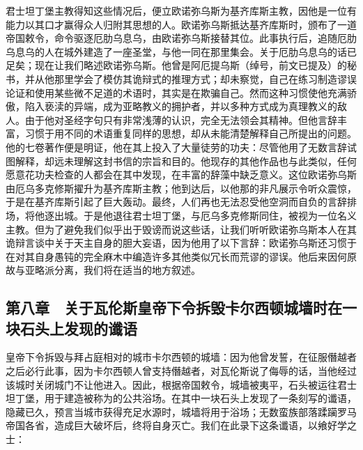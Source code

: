 君士坦丁堡主教得知这些情况后，便立欧诺弥乌斯为基齐库斯主教，因他是一位有能力以其口才赢得众人归附其思想的人。欧诺弥乌斯抵达基齐库斯时，颁布了一道帝国敕令，命令驱逐厄肋乌息乌，由欧诺弥乌斯接替其位。此事执行后，追随厄肋乌息乌的人在城外建造了一座圣堂，与他一同在那里集会。关于厄肋乌息乌的话已足矣；现在让我们略述欧诺弥乌斯。他曾是阿厄提乌斯（绰号，前文已提及）的秘书，并从他那里学会了模仿其诡辩式的推理方式；却未察觉，自己在练习制造谬误论证和使用某些微不足道的术语时，其实是在欺骗自己。然而这种习惯使他充满骄傲，陷入亵渎的异端，成为亚略教义的拥护者，并以多种方式成为真理教义的敌人。由于他对圣经字句只有非常浅薄的认识，完全无法领会其精神。但他言辞丰富，习惯于用不同的术语重复同样的思想，却从未能清楚解释自己所提出的问题。他的七卷著作便是明证，他在其上投入了大量徒劳的功夫：尽管他用了无数言辞试图解释，却远未理解这封书信的宗旨和目的。他现存的其他作品也与此类似，任何愿意花功夫检查的人都会在其中发现，在丰富的辞藻中缺乏意义。这位欧诺弥乌斯由厄乌多克修斯擢升为基齐库斯主教；他到达后，以他那的非凡展示令听众震惊，于是在基齐库斯引起了巨大轰动。最终，人们再也无法忍受他空洞而自负的言辞排场，将他逐出城。于是他退往君士坦丁堡，与厄乌多克修斯同住，被视为一位名义主教。但为了避免我们似乎出于毁谤而说这些话，让我们听听欧诺弥乌斯本人在其诡辩言谈中关于天主自身的胆大妄语，因为他用了以下言辞：欧诺弥乌斯还习惯于在对其自身愚钝的完全麻木中编造许多其他类似冗长而荒谬的谬误。他后来因何原故与亚略派分离，我们将在适当的地方叙述。\par


\subsection{第八章　关于瓦伦斯皇帝下令拆毁卡尔西顿城墙时在一块石头上发现的谶语}

皇帝下令拆毁与拜占庭相对的城市卡尔西顿的城墙：因为他曾发誓，在征服僭越者之后必行此事，因为卡尔西顿人曾支持僭越者，对瓦伦斯说了侮辱的话，当他经过该城时关闭城门不让他进入。因此，根据帝国敕令，城墙被夷平，石头被运往君士坦丁堡，用于建造被称为的公共浴场。在其中一块石头上发现了一条刻写的谶语，隐藏已久，预言当城市获得充足水源时，城墙将用于浴场；无数蛮族部落蹂躏罗马帝国各省，造成巨大破坏后，终将自身灭亡。我们在此录下这条谶语，以飨好学之士：\par

